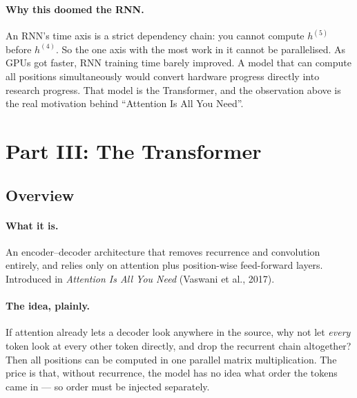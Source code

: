 \documentclass[11pt,a4paper]{article}
\begin{document}
\paragraph{Why this doomed the RNN.} An RNN's time axis is a strict dependency chain: you
cannot compute $h^{(5)}$ before $h^{(4)}$. So the one axis with the most work in it cannot
be parallelised. As GPUs got faster, RNN training time barely improved. A model that can
compute all positions simultaneously would convert hardware progress directly into research
progress. That model is the Transformer, and the observation above is the real motivation
behind ``Attention Is All You Need''.

\section{Part III: The Transformer}

\subsection{Overview}

\paragraph{What it is.} An encoder--decoder architecture that removes recurrence and
convolution entirely, and relies only on attention plus position-wise feed-forward layers.
Introduced in \emph{Attention Is All You Need} (Vaswani et al., 2017).

\paragraph{The idea, plainly.} If attention already lets a decoder look anywhere in the
source, why not let \emph{every} token look at every other token directly, and drop the
recurrent chain altogether? Then all positions can be computed in one parallel matrix
multiplication. The price is that, without recurrence, the model has no idea what order the
tokens came in --- so order must be injected separately.
\end{document}
